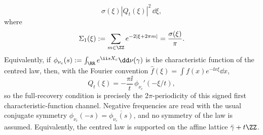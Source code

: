 \begin{theorem}
\begin{equation}
\sigma(\xi)|Q_t(\xi)|^2\,\dd\xi,
\end{equation}
where
\[
\Sigma_1(\xi):=\sum_{m\in\ZZ}e^{-2|\xi+2\pi m|}
=\frac{\sigma(\xi)}{\pi}.
\]
Equivalently, if $\phi_{\nu_c}(s):=\int_{\RR}e^{\ii sX_c}\dd\nu(\gamma)$
is the characteristic function of the centred law, then, with the Fourier
convention $\widehat f(\xi)=\int f(x)e^{-\ii x\xi}\dd x$,
\[
Q_t(\xi)=-\frac{\pi\ii}{t}\,\phi_{\nu_c}'(-\xi/t),
\]
so the full-recovery condition is precisely the $2\pi$-periodicity of this
signed first characteristic-function channel.  Negative frequencies are read
with the usual conjugate symmetry
$\phi_{\nu_c}(-s)=\overline{\phi_{\nu_c}(s)}$, and no symmetry of the law is
assumed.  Equivalently, the centred law is supported on the affine lattice
$\bar{\gamma}+t\ZZ$.
\end{theorem}


